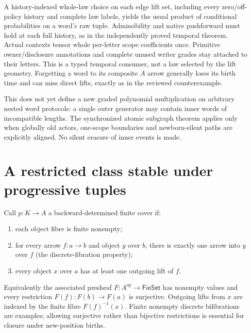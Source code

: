 \documentclass[11pt]{article}
\begin{document}
A history-indexed whole-law choice on each edge lift set, including every zero/off-policy history and complete law labels, yields the usual product of conditional probabilities on a word's raw tuple. Admissibility and native pushforward must hold at each full history, as in the independently proved temporal theorem. Actual contexts tensor whole per-letter scope coefficients once. Primitive owner/disclosure annotations and complete unused writer grades stay attached to their letters. This is a typed temporal consumer, not a law selected by the lift geometry. Forgetting a word to its composite $A$ arrow generally loses its birth time and can miss direct lifts, exactly as in the reviewed counterexample.

This does not yet define a new graded polynomial multiplication on arbitrary nested word protocols: a single outer generator may contain inner words of incompatible lengths. The synchronized atomic subgraph theorem applies only when globally old actors, one-scope boundaries and newborn-silent paths are explicitly aligned. No silent erasure of inner events is made.

\section{A restricted class stable under progressive tuples}
Call $p:K\to A$ a backward-determined finite cover if:
\begin{enumerate}
\item each object fibre is finite nonempty;
\item for every arrow $f:a\to b$ and object $y$ over $b$, there is exactly one arrow into $y$ over $f$ (the discrete-fibration property);
\item every object $x$ over $a$ has at least one outgoing lift of $f$.
\end{enumerate}
Equivalently the associated presheaf $F:A^{op}\to\mathsf{FinSet}$ has nonempty values and every restriction $F(f):F(b)\to F(a)$ is surjective. Outgoing lifts from $x$ are indexed by the finite fibre $F(f)^{-1}(x)$. Finite nonempty discrete bifibrations are examples; allowing surjective rather than bijective restrictions is essential for closure under new-position births.
\end{document}
